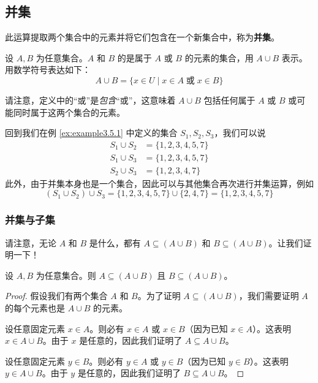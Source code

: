 \subsection{并集}

此运算提取两个集合中的元素并将它们包含在一个新集合中，称为\textbf{并集}。

\begin{definition}
    设 $A, B$ 为任意集合。$A$ 和 $B$ 的是属于 $A$ 或 $B$ 的元素的集合，用 $A \cup B$ 表示。用数学符号表达如下：
    \[A \cup B = \{x \in U \mid x \in A \;\text{或}\; x \in B\}\]
\end{definition}

请注意，定义中的``或''是\emph{包含}``或''，这意味着 $A \cup B$ 包括任何属于 $A$ 或 $B$ 或可能同时属于这两个集合的元素。\\

\begin{example}
    回到我们在例 \ref{ex:example3.5.1} 中定义的集合 $S_1, S_2, S_3$，我们可以说
    \begin{align*}
        S_1 \cup S_2 &= \{1, 2, 3, 4, 5, 7\} \\
        S_1 \cup S_3 &= \{1, 2, 3, 4, 5, 7\} \\
        S_2 \cup S_3 &= \{1, 2, 3, 4, 7\}
    \end{align*}
    此外，由于并集本身也是一个集合，因此可以与其他集合再次进行并集运算，例如
    \[(S_1 \cup S_2) \cup S_3 = \{1, 2, 3, 4, 5, 7\} \cup  \{2, 4, 7\} =  \{1, 2, 3, 4, 5, 7\}\]
\end{example}

\subsubsection*{并集与子集}

请注意，无论 $A$ 和 $B$ 是什么，都有 $A \subseteq (A \cup B)$ 和 $B \subseteq (A \cup B)$。让我们证明一下！

\begin{proposition}
    设 $A, B$ 为任意集合。则 $A \subseteq (A \cup B)$ 且 $B \subseteq (A \cup B)$。
\end{proposition}

\begin{proof}
    假设我们有两个集合 $A$ 和 $B$。为了证明 $A \subseteq (A \cup B)$，我们需要证明 $A$ 的每个元素也是 $A \cup B$ 的元素。

    设任意固定元素 $x \in A$。则必有 $x \in A$ 或 $x \in B$（因为已知 $x \in A$）。这表明 $x \in A \cup B$。由于 $x$ 是任意的，因此我们证明了 $A \subseteq A \cup B$。

    设任意固定元素 $y \in B$。则必有 $y \in A$ 或 $y \in B$（因为已知 $y \in B$）。这表明 $y \in A \cup B$。由于 $y$ 是任意的，因此我们证明了 $B \subseteq A \cup B$。
\end{proof}


